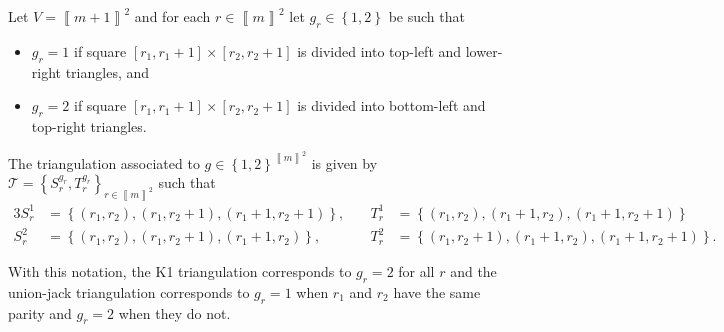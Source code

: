 \documentclass[mnsc]{informs3}
\newcommand{\set}[1]{\left\{#1\right\}}                     %
\newcommand{\bra}[1]{\left(#1\right)}
\newcommand{\sidx}[1]{\left\llbracket     #1 \right\rrbracket}
\begin{document}
\begin{definition}\label{triangulationdef}Let $V=\sidx{m+1}^2$ and for each $r\in \sidx{m}^2$ let $g_r\in \set{1,2}$ be such that 
\begin{itemize}
\item $g_r=1$  if  square $[r_1,r_1+1]\times[r_2,r_2+1]$ is divided into top-left and lower-right triangles, and
\item $g_r=2$  if  square $[r_1,r_1+1]\times[r_2,r_2+1]$ is divided into bottom-left and top-right triangles.
\end{itemize}
The triangulation associated to $g\in \set{1,2}^{\sidx{m}^2}$ is given by 
  $\mathcal{T}=\set{S_r^{g_r},T_r^{g_r}}_{r\in\sidx{m}^2}$ such that  
\begin{alignat*}{3}
S_r^{1}&=\set{\bra{r_1,r_2},\bra{r_1,r_2+1},\bra{r_1+1,r_2+1}},\quad& T_r^{1}&=\set{\bra{r_1,r_2},\bra{r_1+1,r_2},\bra{r_1+1,r_2+1}}\\S_r^{2}&=\set{\bra{r_1,r_2},\bra{r_1,r_2+1},\bra{r_1+1,r_2}},\quad& T_r^{2}&=\set{\bra{r_1,r_2+1},\bra{r_1+1,r_2},\bra{r_1+1,r_2+1}}.
\end{alignat*}
\end{definition}
With this notation, the K1 triangulation corresponds to $g_r=2$ for all $r$ and the union-jack triangulation corresponds to $g_r=1$ when $r_1$ and $r_2$ have the same parity and $g_r=2$ when they do not. 
\end{document}
